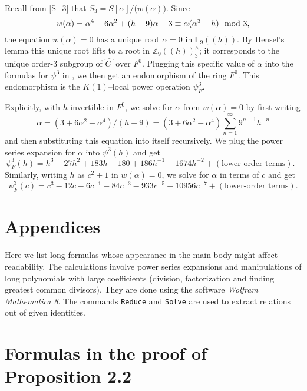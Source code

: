 \documentclass[microtype]{gtpart}     %
\theoremstyle{remark}
\theoremstyle{definition}
\newcommand{\mb}[1]{\mathbb{#1}}
\newcommand{\BF}{{\mb F}}
\newcommand{\BZ}{{\mb Z}}
\newcommand{\HC}{\widehat{C~}\!}
\newcommand{\md}{~~{\rm mod}~}
\newcommand{\A}{\alpha}
\newcommand{\p}{\psi^3}
\begin{document}
Recall from \eqref{S_3} that $S_3 = S[\A] \big/ \big( w(\A) \big)$.  Since 
\[
 w(\A) = \A^4 - 6 \A^2 + (h - 9) \A - 3 \equiv \A (\A^3 + h) \md 3, 
\]
the equation $w(\A) = 0$ has a unique root $\A = 0$ in $\BF_9 (\!(h)\!)$.  By 
Hensel's lemma this unique root lifts to a root in 
$\BZ_9 (\!(h)\!)_3^\wedge$; it corresponds to the unique order-3 subgroup of 
$\HC$ over $F^0$.  Plugging this specific value of $\A$ into the formulas for 
$\p$ in , we then get an endomorphism of the ring $F^0$.  
This endomorphism is the $K(1)$--local power operation $\psi_F^3$.  

Explicitly, with $h$ invertible in $F^0$, we solve for $\A$ from $w(\A) = 0$ 
by first writing 
\[
 \A = (3 + 6 \A^2 - \A^4) / (h - 9) = (3 + 6 \A^2 - \A^4) \sum_{n = 1}^\infty 9^{n-1} h^{-n} 
\]
and then substituting this equation into itself recursively.  We plug the 
power series expansion for $\A$ into $\p(h)$ and get 
\[
 \psi_F^3(h) = h^3 - 27 h^2 + 183 h - 180 + 186 h^{-1} + 1674 h^{-2} + (\text{lower-order terms}).  ~~~
\]
Similarly, writing $h$ as $c^2 + 1$ in $w(\A) = 0$, we solve for $\A$ in 
terms of $c$ and get 
\[
 \psi_F^3(c) = c^3 - 12 c - 6 c^{-1} - 84 c^{-3} - 933 c^{-5} - 10956 c^{-7} + (\text{lower-order terms}).  
\]


\appendix
\section*{}
\section*{Appendices}

Here we list long formulas whose appearance in the main body might affect 
readability.  The calculations involve power series expansions and 
manipulations of long polynomials with large coefficients (division, 
factorization and finding greatest common divisors).  They are done using 
the software {\em Wolfram Mathematica 8}.  The commands \texttt{Reduce} and 
\texttt{Solve} are used to extract relations out of given identities.  


\section{Formulas in the proof of Proposition 2.2}
\label{apx:tors}
\end{document}
